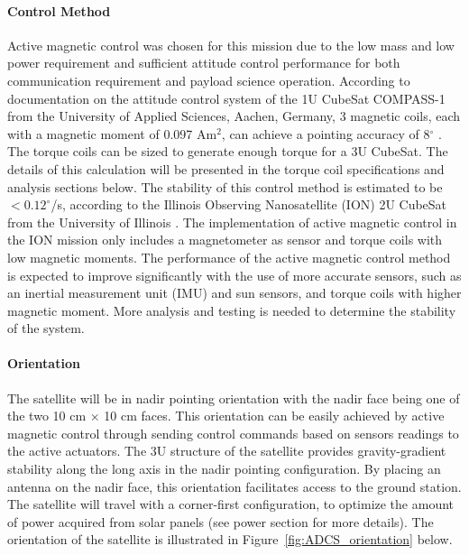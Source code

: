 \documentclass[12pt]{article}
\begin{document}
				\paragraph{Control Method}
				Active magnetic control was chosen for this mission due to the low mass and low power requirement and sufficient attitude control performance for both communication requirement and payload science operation. According to documentation on the attitude control system of the 1U CubeSat COMPASS-1 from the University of Applied Sciences, Aachen, Germany, 3 magnetic coils, each with a magnetic moment of  0.097 Am$^2$, can achieve a pointing accuracy of 8$^\circ$ \cite{adcs_compass}. The torque coils can be sized to generate enough torque for a 3U CubeSat. The details of this calculation will be presented in the torque coil specifications and analysis sections below. The stability of this control method is estimated to be $< 0.12^\circ$/s, according to the Illinois Observing Nanosatellite (ION) 2U CubeSat from the University of Illinois \cite{adcs_ion}. The implementation of active magnetic control in the ION mission only includes a magnetometer as sensor and torque coils with low magnetic moments. The performance of the active magnetic control method is expected to improve significantly with the use of more accurate sensors, such as an inertial measurement unit (IMU) and sun sensors, and torque coils with higher magnetic moment. More analysis and testing is needed to determine the stability of the system. 

				\paragraph{Orientation}
				The satellite will be in nadir pointing orientation with the nadir face being one of the two 10 cm $\times$ 10 cm faces. This orientation can be easily achieved by active magnetic control through sending control commands based on sensors readings to the active actuators. The 3U structure of the satellite provides gravity-gradient stability along the long axis in the nadir pointing configuration. By placing an antenna on the nadir face, this orientation facilitates access to the ground station. The satellite will travel with a corner-first configuration, to optimize the amount of power acquired from solar panels (see power section for more details). The orientation of the satellite is illustrated in Figure~\ref{fig:ADCS_orientation} below. 
\end{document}
